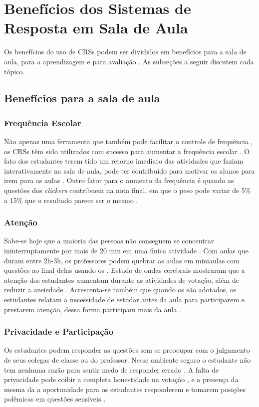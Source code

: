 \section{Benefícios dos Sistemas de Resposta em Sala de Aula}\label{sec:beneficios}
Os benefícios do uso de CRSs podem ser divididos
em benefícios para a sala de aula, para a aprendizagem e para avaliação \cite{Kay2009}. As
subseções a seguir discutem cada tópico.

\subsection{Benefícios para a sala de aula}

\subsubsection{Frequência Escolar}
Não apenas uma ferramenta que também pode facilitar o controle de frequência
\cite{Strasser2010}, os CRSs têm sido utilizados com sucesso para aumentar
a frequência escolar \cite{Fotaris2016, Velasco2013, Puente2012, Mayer2009, Caldwell2007}. O fato dos
estudantes terem tido um retorno imediato das atividades que faziam interativamente
na sala de aula, pode ter contribuído para motivar os alunos para irem para as aulas \cite{Puente2012}.
Outro fator para o aumento da frequência é quando as questões dos \textit{clickers} contribuem na nota final,
em que o peso pode variar de 5\% a 15\% que o resultado parece ser o mesmo \cite{Caldwell2007}.

\subsubsection{Atenção}\label{subsubsection:attention}
Sabe-se hoje que a maioria das pessoas não conseguem se concentrar ininterruptamente
por mais de 20 min em uma única atividade \cite{Caldwell2007, DInverno2003}. Com aulas que
duram entre 2h-3h, os professores podem quebrar as aulas em miniaulas
com questões ao final delas usando os {\clickers} \cite{Hunsu2016}. Estudo de
ondas cerebrais mostraram que a atenção dos estudantes aumentam durante as
atividades de votação, além de reduzir a ansiedade \cite{Sun2014}. Acrescenta-se
também que quando os {\clickers} são adotados, os estudantes relatam a necessidade
de estudar antes da aula para participarem e prestarem atenção, dessa forma participam mais da aula \cite{Terrion2012}.

\subsubsection{Privacidade e Participação}\label{subsubsection:privacy}
Os estudantes podem responder as questões sem se preocupar com o julgamento
de seus colegas de classe ou do professor. Nesse ambiente seguro o estudante
não tem nenhuma razão para sentir medo de responder errado \cite{Schmidt2011}.
 A falta de privacidade pode coibir
a completa honestidade na votação \cite{Caldwell2007}, e a presença da mesma da a oportunidade
para os estudantes responderem e tomarem posições polêmicas em questões sensíveis \cite{Rana2016}.

